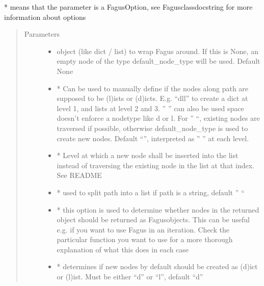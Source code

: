 \documentclass[a4paper,10pt,english]{sphinxmanual}
\begin{document}
\begin{fulllineitems}
\begin{fulllineitems}
\sphinxAtStartPar
* means that the parameter is a FagusOption, see Fagus\sphinxhyphen{}class\sphinxhyphen{}docstring for more information about options
\begin{quote}\begin{description}
\item[{Parameters}] \leavevmode\begin{itemize}
\item {}
\sphinxAtStartPar
{} \textendash{} object (like dict / list) to wrap Fagus around. If this is None, an empty node of the type
default\_node\_type will be used. Default None

\item {}
\sphinxAtStartPar
{} \textendash{} * Can be used to manually define if the nodes along path are supposed to be (l)ists or
(d)icts. E.g. “dll” to create a dict at level 1, and lists at level 2 and 3. ” ” can also be used \sphinxhyphen{}
space doesn’t enforce a node\sphinxhyphen{}type like d or l. For ” “, existing nodes are traversed if possible,
otherwise default\_node\_type is used to create new nodes. Default “”, interpreted as ” ” at each level.

\item {}
\sphinxAtStartPar
{} \textendash{} * Level at which a new node shall be inserted into the list instead of traversing the
existing node in the list at that index. See README

\item {}
\sphinxAtStartPar
{} \textendash{} * used to split path into a list if path is a string, default ” “

\item {}
\sphinxAtStartPar
{} \textendash{} * this option is used to determine whether nodes in the returned object should be returned as
Fagus\sphinxhyphen{}objects. This can be useful e.g. if you want to use Fagus in an iteration. Check the particular
function you want to use for a more thorough explanation of what this does in each case

\item {}
\sphinxAtStartPar
{} \textendash{} * determines if new nodes by default should be created as (d)ict or (l)ist. Must be
either “d” or “l”, default “d”


\end{itemize}
\end{description}
\end{quote}
\end{fulllineitems}
\end{fulllineitems}
\end{document}
